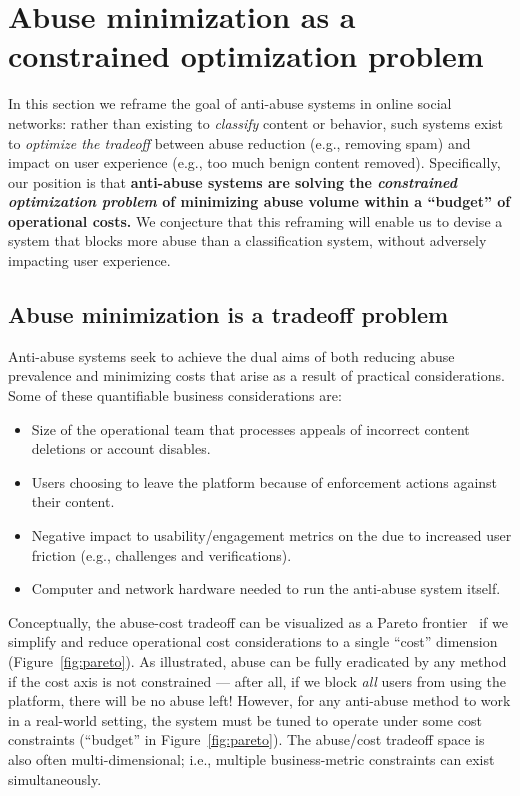 \section{Abuse minimization as a constrained optimization problem}\label{sec:opt}

In this section we reframe the goal of anti-abuse systems in online social networks: rather than existing to {\em classify} content or behavior, such systems exist to {\em optimize the tradeoff} between abuse reduction (e.g., removing spam) and impact on user experience (e.g., too much benign content removed). Specifically, our position is that {\bf anti-abuse systems are solving the {\em constrained optimization problem} of minimizing abuse volume within a ``budget'' of operational costs.} We conjecture that this reframing will enable us to devise a system that blocks more abuse than a classification system, without adversely impacting user experience.

\subsection{Abuse minimization is a tradeoff problem} 
\label{sec:business_constraints}

Anti-abuse systems seek to achieve the dual aims of both reducing abuse prevalence and minimizing costs that arise as a result of practical considerations. Some of these quantifiable business considerations are:

\begin{itemize}
\setlength\itemsep{-2pt}
    \item Size of the operational team that processes appeals of incorrect content deletions or account disables.
    \item Users choosing to leave the platform because of enforcement actions against their content.
    \item Negative impact to usability/engagement metrics on the \osn due to increased user friction (e.g., challenges and verifications).
    \item Computer and network hardware needed to run the anti-abuse system itself.
\end{itemize}

Conceptually, the abuse-cost tradeoff can be visualized as a Pareto frontier~\cite{Wilkinson_2006} if we simplify and reduce operational cost considerations to a single ``cost'' dimension (Figure~\ref{fig:pareto}).
As illustrated, abuse can be fully eradicated by any method if the cost axis is not constrained --- after all, if we block {\em all} users from using the platform, there will be no abuse left! However, for any anti-abuse method to work in a real-world setting, the system must be tuned to operate under some cost constraints (``budget'' in Figure~\ref{fig:pareto}).
The abuse/cost tradeoff space is also often multi-dimensional; i.e., multiple business-metric constraints can exist simultaneously. 

